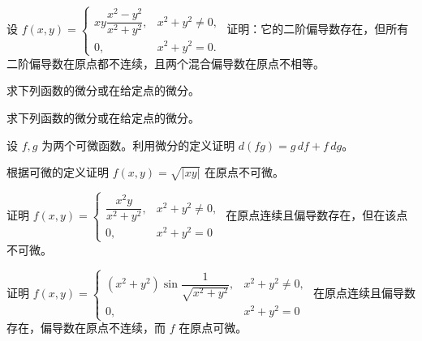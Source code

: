 \noindent\begin{minipage}{\textwidth}
设 $f(x,y)=\begin{cases}xy\dfrac{x^2-y^2}{x^2+y^2},&x^2+y^2\ne0,\\0,&x^2+y^2=0.\end{cases}$ 证明：它的二阶偏导数存在，但所有二阶偏导数在原点都不连续，且两个混合偏导数在原点不相等。
\end{minipage}\par\vfill
\noindent\begin{minipage}{\textwidth}
求下列函数的微分或在给定点的微分。
\end{minipage}\par\vfill
\noindent\begin{minipage}{\textwidth}
求下列函数的微分或在给定点的微分。
\end{minipage}\par\vfill
\newpage
\noindent\begin{minipage}{\textwidth}
设 $f,g$ 为两个可微函数。利用微分的定义证明 $d(fg)=g\,df+f\,dg$。
\end{minipage}\par\vfill
\noindent\begin{minipage}{\textwidth}
根据可微的定义证明 $f(x,y)=\sqrt{|xy|}$ 在原点不可微。
\end{minipage}\par\vfill
\noindent\begin{minipage}{\textwidth}
证明 $f(x,y)=\begin{cases}\dfrac{x^2y}{x^2+y^2},&x^2+y^2\ne0,\\0,&x^2+y^2=0\end{cases}$ 在原点连续且偏导数存在，但在该点不可微。
\end{minipage}\par\vfill
\noindent\begin{minipage}{\textwidth}
证明 $f(x,y)=\begin{cases}(x^2+y^2)\sin\dfrac1{\sqrt{x^2+y^2}},&x^2+y^2\ne0,\\0,&x^2+y^2=0\end{cases}$ 在原点连续且偏导数存在，偏导数在原点不连续，而 $f$ 在原点可微。
\end{minipage}\par\vfill
